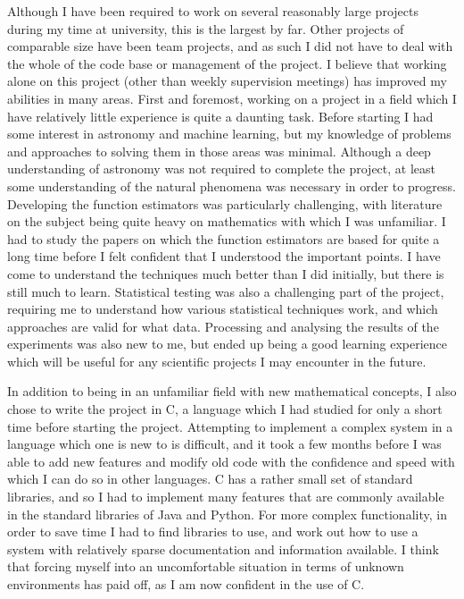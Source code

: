 \documentclass[a4paper,11pt]{article}
\begin{document}
   Although I have been required to work on several reasonably large projects
   during my time at university, this is the largest by far. Other projects of
   comparable size have been team projects, and as such I did not have to deal
   with the whole of the code base or management of the project. I believe that
   working alone on this project (other than weekly supervision meetings) has
   improved my abilities in many areas. First and foremost, working on a project
   in a field which I have relatively little experience is quite a daunting
   task. Before starting I had some interest in astronomy and machine learning,
   but my knowledge of problems and approaches to solving them in those areas
   was minimal. Although a deep understanding of astronomy was not required to
   complete the project, at least some understanding of the natural phenomena
   was necessary in order to progress. Developing the function estimators was
   particularly challenging, with literature on the subject being quite heavy on
   mathematics with which I was unfamiliar. I had to study the papers on which
   the function estimators are based for quite a long time before I felt
   confident that I understood the important points. I have come to understand
   the techniques much better than I did initially, but there is still much to
   learn. Statistical testing was also a challenging part of the project,
   requiring me to understand how various statistical techniques work, and which
   approaches are valid for what data. Processing and analysing the results of
   the experiments was also new to me, but ended up being a good learning
   experience which will be useful for any scientific projects I may encounter
   in the future.

   In addition to being in an unfamiliar field with new mathematical concepts, I
   also chose to write the project in C, a language which I had studied for only
   a short time before starting the project. Attempting to implement a complex
   system in a language which one is new to is difficult, and it took a few
   months before I was able to add new features and modify old code with the
   confidence and speed with which I can do so in other languages. C has a
   rather small set of standard libraries, and so I had to implement many
   features that are commonly available in the standard libraries of Java and
   Python. For more complex functionality, in order to save time I had to find
   libraries to use, and work out how to use a system with relatively sparse
   documentation and information available. I think that forcing myself into an
   uncomfortable situation in terms of unknown environments has paid off, as I
   am now confident in the use of C. 
\end{document}
